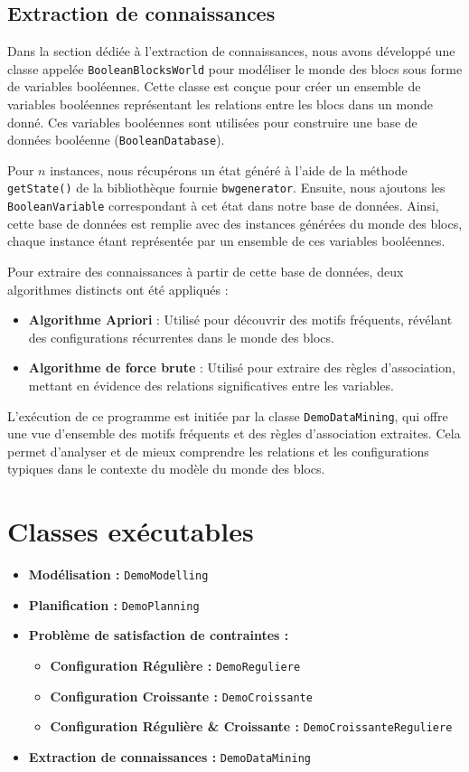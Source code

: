 \documentclass[12pt]{article}
\begin{document}
\subsection{Extraction de connaissances}
Dans la section dédiée à l'extraction de connaissances, nous avons développé une classe appelée \texttt{BooleanBlocksWorld} pour modéliser le monde des blocs sous forme de variables booléennes. Cette classe est conçue pour créer un ensemble de variables booléennes représentant les relations entre les blocs dans un monde donné. Ces variables booléennes sont utilisées pour construire une base de données booléenne (\texttt{BooleanDatabase}).

Pour $n$ instances, nous récupérons un état généré à l'aide de la méthode \texttt{getState()} de la bibliothèque fournie \texttt{bwgenerator}. Ensuite, nous ajoutons les \texttt{BooleanVariable} correspondant à cet état dans notre base de données. Ainsi, cette base de données est remplie avec des instances générées du monde des blocs, chaque instance étant représentée par un ensemble de ces variables booléennes.

Pour extraire des connaissances à partir de cette base de données, deux algorithmes distincts ont été appliqués :
\begin{itemize}
    \item \textbf{Algorithme Apriori} : Utilisé pour découvrir des motifs fréquents, révélant des configurations récurrentes dans le monde des blocs.
    \item \textbf{Algorithme de force brute} : Utilisé pour extraire des règles d'association, mettant en évidence des relations significatives entre les variables.
\end{itemize}

L'exécution de ce programme est initiée par la classe \texttt{DemoDataMining}, qui offre une vue d'ensemble des motifs fréquents et des règles d'association extraites. Cela permet d'analyser et de mieux comprendre les relations et les configurations typiques dans le contexte du modèle du monde des blocs.

\section{Classes exécutables}
\begin{itemize}
    \item \textbf{Modélisation :} \texttt{DemoModelling}
    \item \textbf{Planification :} \texttt{DemoPlanning}
    \item \textbf{Problème de satisfaction de contraintes :}
    \begin{itemize}
        \item \textbf{Configuration Régulière :} \texttt{DemoReguliere}
        \item \textbf{Configuration Croissante :} \texttt{DemoCroissante}
        \item \textbf{Configuration Régulière \& Croissante :} \texttt{DemoCroissanteReguliere}
    \end{itemize}
    \item \textbf{Extraction de connaissances :} \texttt{DemoDataMining}
\end{itemize}
\end{document}
